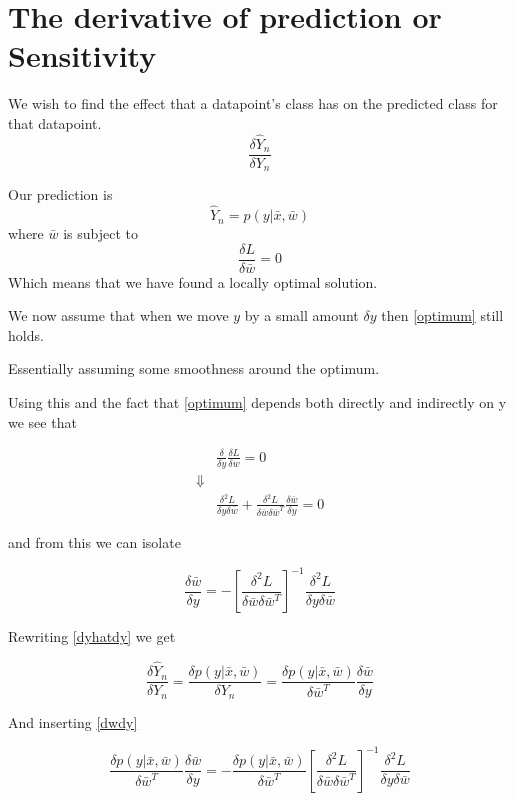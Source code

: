 
\section{The derivative of prediction or Sensitivity}
We wish to find the effect that a datapoint's class has on the predicted class for that datapoint.
\begin{equation}
\label{dyhatdy}
\frac{\delta \hat{Y}_n}{\delta Y_n}
\end{equation}

Our prediction is 
\begin{equation}
 \hat{Y}_n = p(y|\bar{x},\bar{w})
\end{equation}
where $\bar{w}$ is subject to 
\begin{equation}
\label{optimum}
\frac{\delta L}{\delta\bar{w}}=0
\end{equation}
Which means that we have found a locally optimal solution.

We now assume that when we move $y$ by a small amount $\delta y$ then \ref{optimum} still holds.

Essentially assuming some smoothness around the optimum.

Using this and the fact that \ref{optimum} depends both directly and indirectly on y we see that

\begin{eqnarray*}
&\frac{\delta}{\delta y} \frac{\delta L}{\delta w} = 0\\
\Downarrow & \\
&\frac{\delta^2 L}{\delta y \delta \bar{w}} + \frac{\delta^2 L}{\delta \bar{w} \delta \bar{w}^T} \frac{\delta \bar{w}}{\delta y}= 0
\end{eqnarray*}

and from this we can isolate

\begin{equation}
\label{dwdy}
\frac{\delta \bar{w}}{\delta y} = - \left[ \frac{\delta^2 L}{\delta \bar{w} \delta \bar{w}^T} \right]^{-1} \frac{\delta^2 L}{\delta y \delta \bar{w}} 
\end{equation}

Rewriting \ref{dyhatdy} we get

\begin{equation}
\frac{\delta \hat{Y}_n}{\delta Y_n} = \frac{\delta p(y|\bar{x},\bar{w})}{\delta Y_n} =  \frac{\delta p(y|\bar{x},\bar{w})}{\delta \bar{w}^T} \frac{\delta \bar{w}}{\delta y}
\end{equation}

And inserting \ref{dwdy} 

\begin{equation}
\frac{\delta p(y|\bar{x},\bar{w})}{\delta \bar{w}^T} \frac{\delta \bar{w}}{\delta y} = - \frac{\delta p(y|\bar{x},\bar{w})}{\delta \bar{w}^T} \left[ \frac{\delta^2 L}{\delta \bar{w} \delta \bar{w}^T} \right]^{-1} \frac{\delta^2 L}{\delta y \delta \bar{w}}
\end{equation}

